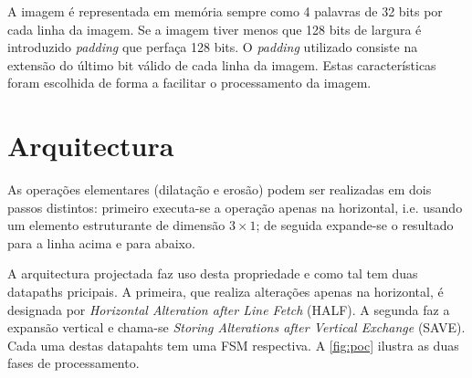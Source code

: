 \documentclass[a4paper]{article}
\begin{document}
A imagem é representada em memória sempre como 4 palavras de 32 bits por cada linha da imagem. Se a imagem tiver menos que 128 bits de largura é introduzido \textit{padding} que perfaça 128 bits. O \textit{padding} utilizado consiste na extensão do último bit válido de cada linha da imagem. Estas características foram escolhida de forma a facilitar o processamento da imagem.

\section{Arquitectura}
As operações elementares (dilatação e erosão) podem ser realizadas em dois passos distintos: primeiro executa-se a operação apenas na horizontal, i.e. usando um elemento estruturante de dimensão $3\times1$; de seguida expande-se o resultado para a linha acima e para abaixo.

A arquitectura projectada faz uso desta propriedade e como tal tem duas datapaths pricipais. A primeira, que realiza alterações apenas na horizontal, é designada por \textit{Horizontal Alteration after Line Fetch} (HALF). A segunda faz a expansão vertical e chama-se \textit{Storing Alterations after Vertical Exchange} (SAVE). Cada uma destas datapahts tem uma FSM respectiva. A \autoref{fig:poc} ilustra as duas fases de processamento.
\end{document}
